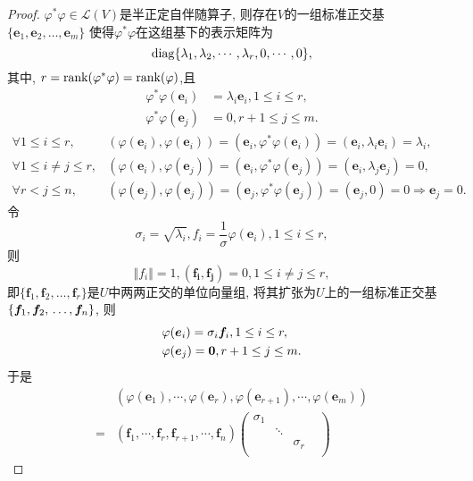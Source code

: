     \begin{proof}
      $\varphi^*\varphi\in\mathscr{L}(V)$是半正定自伴随算子,
      则存在$V$的一组标准正交基$\{\bm{e}_1,\bm{e}_2,\dots,\bm{e}_m\}$
      使得$\varphi^*\varphi$在这组基下的表示矩阵为
      \[
        \operatorname{diag}\{\lambda_1,\lambda_2,\cdots,\lambda_r,0,\cdots,0\},
      \]
      其中, $r=\operatorname{rank}(\varphi^*\varphi)=\operatorname{rank}(\varphi)$,且
      \begin{align*}
        \varphi^*\varphi(\bm{e}_i) &  = \lambda_i\bm{e}_i, 1\leq i \leq r,\\
        \varphi^*\varphi(\bm{e}_j) & = 0, r+1\leq j\leq m.
      \end{align*}
      \begin{align*}
        \forall 1\leq i \leq r, & (\varphi(\bm{e}_i),\varphi(\bm{e}_i)) =
        (\bm{e}_i,\varphi^*\varphi(\bm{e}_i)) = (\bm{e}_i,\lambda_i\bm{e}_i) = \lambda_i,\\
        \forall 1\leq i\neq j\leq r, & (\varphi(\bm{e}_i),\varphi(\bm{e}_j)) =
        (\bm{e}_i,\varphi^*\varphi(\bm{e}_j)) = (\bm{e}_i,\lambda_j\bm{e}_j) = 0,\\
        \forall r < j \leq n, & (\varphi(\bm{e}_j),\varphi(\bm{e}_j)) = 
        (\bm{e}_j,\varphi^*\varphi(\bm{e}_j)) = (\bm{e}_j,0) = 0 \Longrightarrow
        \bm{e}_j =0.
      \end{align*}
      令
      \[
      \sigma_i=\sqrt{\lambda_i}, f_i=\frac{1}{\sigma}\varphi(\bm{e}_i),
      1\leq i \leq r,
      \]
      则
      \[
        \Vert f_i\Vert=1, (\bm{f_i},\bm{f_j})=0, 1\leq i\neq j\leq r,
      \]
      即$\{\bm{f}_1,\bm{f}_2,\dots,\bm{f}_r\}$是$U$中两两正交的单位向量组,
      将其扩张为$U$上的一组标准正交基$\{\bm{f}_1,\bm{f}_2,\\
      \dots,\bm{f}_n\}$, 则
      \begin{align}
        & \varphi(\bm{e}_i)=\sigma_i\bm{f}_i, 1\leq i\leq r,\label{eq:SVD1}\\
        & \varphi(\bm{e}_j)=\bm{0}, r+1\leq j\leq m.\notag
      \end{align}
      于是
      \begin{align*}
      & (\varphi(\bm{e}_1),\cdots,\varphi(\bm{e}_r),\varphi(\bm{e}_{r+1}),
      \cdots,\varphi(\bm{e}_m)) \\
      = & (\bm{f}_1,\cdots,\bm{f}_r,\bm{f}_{r+1},\cdots,\bm{f}_n)
      \begin{pmatrix}
        \sigma_1&&&\\
        &\ddots&&\\
        &&\sigma_r&\\

\end{pmatrix}
\end{align*}
\end{proof}
